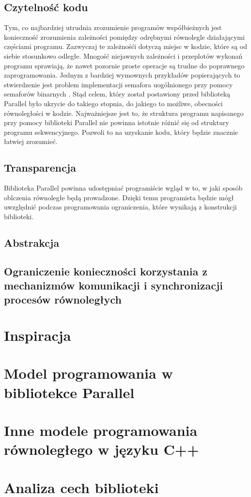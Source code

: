 \subsection{Czytelność kodu}

  Tym, co najbardziej utrudnia zrozumienie programów współbieżnych jest konieczność zrozumienia zależności pomiędzy odrębnymi równolegle działającymi częściami programu.
  Zazwyczaj te zależnośći dotyczą miejsc w kodzie, które są od siebie stosunkowo odległe.
  Mnogość niejawnych zależności i przeplotów wykonań programu sprawiają, że nawet pozornie proste operacje są trudne do poprawnego zaprogramowania.
  Jednym z bardziej wymownych przykładów popierających to stwierdzenie jest problem implementacji semafora uogólnionego przy pomocy semaforów binarnych \cite{gensem}.
  Stąd celem, który został postawiony przed biblioteką Parallel było ukrycie do takiego stopnia, do jakiego to możliwe, obecności równoległości w kodzie.
  Najważniejsze jest to, że struktura programu napisanego przy pomocy biblioteki Parallel nie powinna istotnie różnić się od struktury programu sekwencyjnego.
  Pozwoli to na uzyskanie kodu, który będzie znacznie łatwiej zrozumieć.

\subsection{Transparencja}

  Biblioteka Parallel powinna udostępniać programiście wgląd w to, w jaki sposób oblczenia równoległe będą prowadzone.
  Dzięki temu programista będzie mógł uwzględnić podczas programowania ograniczenia, które wynikają z konstrukcji biblioteki.
  
  
\subsection{Abstrakcja}

\subsection{Ograniczenie konieczności korzystania z mechanizmów komunikacji i synchronizacji procesów równoległych}


\section{Inspiracja}

\section{Model programowania w bibliotekce Parallel}

\section{Inne modele programowania równoległego w języku C++}

\section{Analiza cech biblioteki}